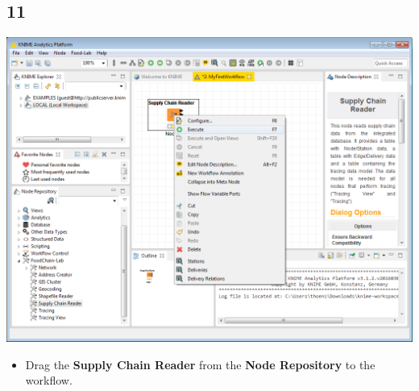\documentclass{beamer}
\begin{document}
\subsection{11}
\begin{frame}
	\begin{center}
  		\includegraphics[height=0.6\textheight]{11.png}
	\end{center}
	\begin{itemize}
		\item Drag the \textbf{Supply Chain Reader} from the \textbf{Node Repository} to the workflow.
	\end{itemize}
\end{frame}
\end{document}
